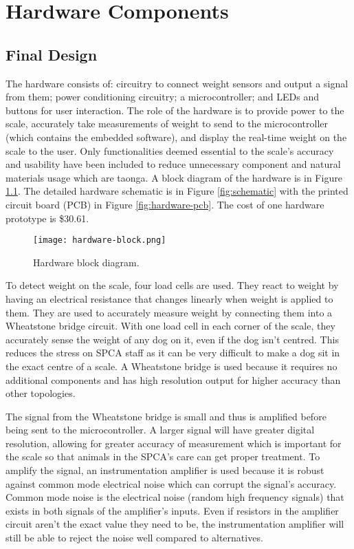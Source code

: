 
\chapter{Hardware Components}

\section{Final Design}

The hardware consists of: circuitry to connect weight sensors and output a signal from them; power conditioning circuitry; a microcontroller; and LEDs and buttons for user interaction. The role of the hardware is to provide power to the scale, accurately take measurements of weight to send to the microcontroller (which contains the embedded software), and display the real-time weight on the scale to the user. Only functionalities deemed essential to the scale’s accuracy and usability have been included to reduce unnecessary component and natural materials usage which are taonga. A block diagram of the hardware is in Figure \ref{fig:hardware-block}. The detailed hardware schematic is in Figure \ref{fig:schematic} with the printed circuit board (PCB) in Figure \ref{fig:hardware-pcb}. The cost of one hardware prototype is \$30.61.

\begin{figure}[!ht]
	\centering
	\texttt{[image: hardware-block.png]}
	\caption{Hardware block diagram.}
	\label{fig:hardware-block}
\end{figure}

To detect weight on the scale, four load cells are used. They react to weight by having an electrical resistance that changes linearly when weight is applied to them. They are used to accurately measure weight by connecting them into a Wheatstone bridge circuit. With one load cell in each corner of the scale, they accurately sense the weight of any dog on it, even if the dog isn’t centred. This reduces the stress on SPCA staff as it can be very difficult to make a dog sit in the exact centre of a scale. A Wheatstone bridge is used because it requires no additional components and has high resolution output for higher accuracy than other topologies.

The signal from the Wheatstone bridge is small and thus is amplified before being sent to the microcontroller. A larger signal will have greater digital resolution, allowing for greater accuracy of measurement which is important for the scale so that animals in the SPCA’s care can get proper treatment. To amplify the signal, an instrumentation amplifier is used because it is robust against common mode electrical noise which can corrupt the signal’s accuracy. Common mode noise is the electrical noise (random high frequency signals) that exists in both signals of the amplifier’s inputs. Even if resistors in the amplifier circuit aren’t the exact value they need to be, the instrumentation amplifier will still be able to reject the noise well compared to alternatives.

